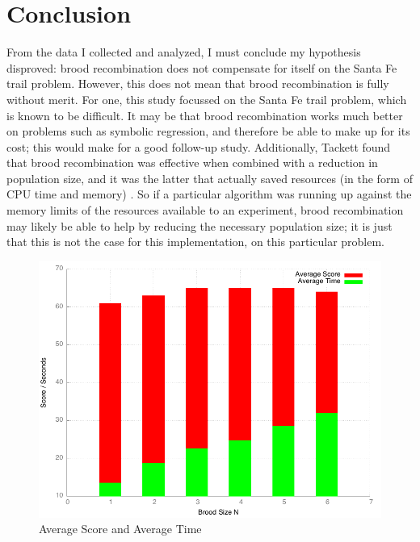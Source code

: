 \documentclass{acm_proc_article-sp}
\begin{document}
\section{Conclusion}
From the data I collected and analyzed, I must conclude my hypothesis
disproved: brood recombination does not compensate for itself on the
Santa Fe trail problem. However, this does not mean that brood
recombination is fully without merit. For one, this study focussed on
the Santa Fe trail problem, which is known to be difficult. It may be
that brood recombination works much better on problems such as
symbolic regression, and therefore be able to make up for its cost;
this would make for a good follow-up study. Additionally, Tackett
found that brood recombination was effective when combined with a
reduction in population size, and it was the latter that actually
saved resources (in the form of CPU time and memory)
\cite{Tackett:Brood}. So if a particular algorithm was running up
against the memory limits of the resources available to an experiment,
brood recombination may likely be able to help by reducing the
necessary population size; it is just that this is not the case for
this implementation, on this particular problem.

\begin{figure}
\centering
\includegraphics[width=.9\linewidth]{./results.png}
\caption{\label{fig:Figure-1}Average Score and Average Time}
\end{figure}
\end{document}

